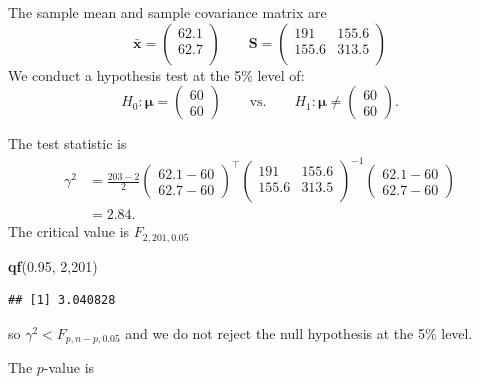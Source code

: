 \documentclass[
]{book}
\newenvironment{Shaded}{\begin{snugshade}}{\end{snugshade}}
\newcommand{\DecValTok}[1]{\textcolor[rgb]{0.00,0.00,0.81}{#1}}
\newcommand{\FloatTok}[1]{\textcolor[rgb]{0.00,0.00,0.81}{#1}}
\newcommand{\FunctionTok}[1]{\textcolor[rgb]{0.13,0.29,0.53}{\textbf{#1}}}
\newcommand{\NormalTok}[1]{#1}
\theoremstyle{definition}
\theoremstyle{definition}
\theoremstyle{definition}
\theoremstyle{definition}
\theoremstyle{remark}
\begin{document}
The sample mean and sample covariance matrix are
\[\bar{\mathbf x} = \begin{pmatrix}62.1 \\62.7 \\\end{pmatrix} \qquad \mathbf S= \begin{pmatrix}191&155.6 \\155.6&313.5 \\\end{pmatrix}\]
We conduct a hypothesis test at the 5\% level of:
\[H_0: {\boldsymbol{\mu}}= \begin{pmatrix} 60 \\ 60 \end{pmatrix} \qquad \text{vs.} \qquad H_1: {\boldsymbol{\mu}}\neq \begin{pmatrix} 60 \\ 60 \end{pmatrix}.\]

The test statistic is
\begin{align*}
\gamma^2 &= \frac{203-2}{2} \begin{pmatrix} 62.1 - 60 \\ 62.7 - 60 \end{pmatrix}^\top \begin{pmatrix}191&155.6 \\155.6&313.5 \\\end{pmatrix}^{-1} \begin{pmatrix} 62.1 - 60 \\ 62.7 - 60 \end{pmatrix} \\
 &= 2.84.
\end{align*}
The critical value is \(F_{2,201,0.05}\)

\begin{Shaded}
\begin{Highlighting}[]
 \FunctionTok{qf}\NormalTok{(}\FloatTok{0.95}\NormalTok{, }\DecValTok{2}\NormalTok{,}\DecValTok{201}\NormalTok{)}
\end{Highlighting}
\end{Shaded}

\begin{verbatim}
## [1] 3.040828
\end{verbatim}

so \(\gamma^2 < F_{p,n-p,0.05}\) and we do not reject the null hypothesis at the 5\% level.

The \(p\)-value is
\end{document}
